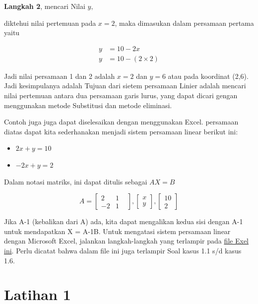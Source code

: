 \documentclass[
]{book}
\providecommand{\tightlist}{%
  \setlength{\itemsep}{0pt}\setlength{\parskip}{0pt}}
\begin{document}
\textbf{Langkah 2}, mencari Nilai \(y,\)

diktehui nilai pertemuan pada \(x=2\), maka dimasukan dalam persamaan pertama yaitu

\[
\begin{aligned}
y &= 10-2x \\
y &= 10-(2 \times 2)
\end{aligned}
\]

Jadi nilai persamaan 1 dan 2 adalah \(x=2\) dan \(y=6\) atau pada koordinat (2,6). Jadi kesimpulanya adalah Tujuan dari sietem persamaan Linier adalah mencari nilai pertemuan antara dua persamaan garis lurus, yang dapat dicari gengan menggunakan metode Substitusi dan metode eliminasi.

Contoh juga juga dapat diselesaikan dengan menggunakan Excel. persamaan diatas dapat kita sederhanakan menjadi sistem persamaan linear berikut ini:

\begin{itemize}
\tightlist
\item
  \(2x + y = 10\)
\item
  \(-2x +y = 2\)
\end{itemize}

Dalam notasi matriks, ini dapat ditulis sebagai \(AX = B\)

\[ A=
\begin{bmatrix}
    2 & 1 &  \\
   -2 & 1 
\end{bmatrix}, 
\begin{bmatrix}
    x  \\
   y 
\end{bmatrix},
\begin{bmatrix}
    10  \\
   2 
\end{bmatrix}
\]

Jika A-1 (kebalikan dari A) ada, kita dapat mengalikan kedua sisi dengan A-1 untuk mendapatkan X = A-1B. Untuk mengatasi sistem persamaan linear dengan Microsoft Excel, jalankan langkah-langkah yang terlampir pada \href{https://github.com/Bakti-Siregar/Matematika-Bisnis/raw/master/data/dasar-matematika-bisnis.xlsx}{file Exel ini}. Perlu dicatat bahwa dalam file ini juga terlampir Soal kasus 1.1 s/d kasus 1.6.

\hypertarget{latihan-1}{%
\section{Latihan 1}\label{latihan-1}}
\end{document}

